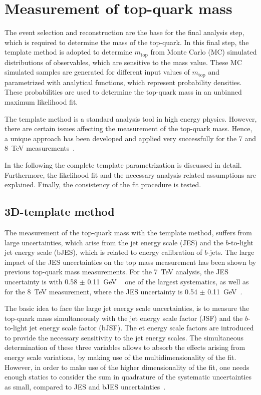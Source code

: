 \chapter{Measurement of top-quark mass}
\label{sec:Temp1}

The event selection and \rm reconstruction are the base for the final analysis step, which is required to determine the mass of the top-quark. In this final step, the template method  is adopted to determine $m_{\text{top}}$  from Monte Carlo (MC) simulated distributions of observables, which are sensitive to the mass value. These MC simulated samples are generated for different input values of $m_{\text{top}}$ and parametrized with analytical functions, which represent probability densities. These probabilities are used to determine the top-quark mass in an unbinned maximum likelihood fit.

 The template method is a standard analysis tool in high energy physics. However, there are certain issues affecting the measurement of the top-quark mass.  Hence, a unique approach has been developed and applied very successfully for the 7 and 8~TeV measurements~\cite{Aad:2015nba,ATLAS-CONF-2017-071}.

In the following the complete template parametrization is discussed in detail. Furthermore, the likelihood fit and the necessary analysis related assumptions are explained. Finally, the consistency of the fit procedure is tested. 


\section{3D-template method}
The measurement of the top-quark mass with the template method, suffers from large uncertainties, which arise from the jet energy scale (JES) and the $b$-to-light jet energy scale (bJES), which is related to energy calibration of $b$-jets. The large impact of the JES uncertainties on the top mass measurement has been shown by previous top-quark mass measurements. For  the 7~TeV analysis, the JES uncertainty is with 0.58 $ \pm $ 0.11~GeV ~\cite{Aad:2015nba} one of the largest systematics, as well as for  the 8~TeV measurement, where the JES uncertainty is 0.54 $\pm$ 0.11~GeV~\cite{ATLAS-CONF-2017-071}.

 The basic idea to face the large jet energy scale uncertainties, is to measure the top-quark mass simultaneously with the jet energy scale factor (JSF) and the $b$-to-light jet energy scale factor (bJSF). The et energy scale factors are introduced to provide the necessary sensitivity to the jet energy scales. The simultaneous determination of these three variables allows to absorb the effects arising from energy scale variations, by making use of the multidimensionality of the fit. 
However, in order to make use of the higher dimensionality of the fit, one needs enough statics to consider the sum in quadrature of the systematic uncertainties as small, compared to JES and bJES uncertainties~\cite{ATLAS-CONF-2017-071}. 



